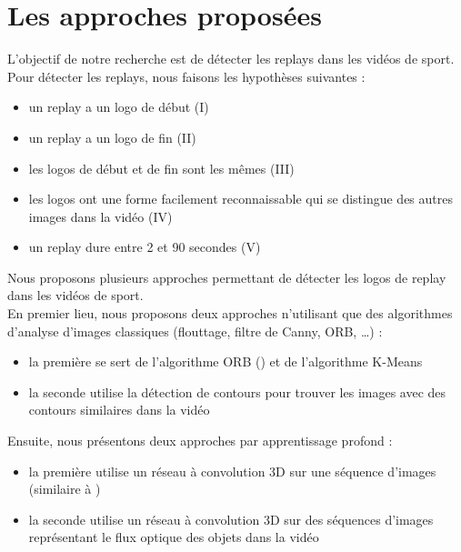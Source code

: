\documentclass[11pt]{article}
\begin{document}
\newpage
\section{Les approches proposées}
\label{sec:orgf5da6ef}
L'objectif de notre recherche est de détecter les replays dans les vidéos de sport.\\

Pour détecter les replays, nous faisons les hypothèses suivantes :\\
\begin{itemize}
\item un replay a un logo de début (I)\\
\item un replay a un logo de fin (II)\\
\item les logos de début et de fin sont les mêmes (III)\\
\item les logos ont une forme facilement reconnaissable qui se distingue des  autres images dans la vidéo (IV)\\
\item un replay dure entre 2 et 90 secondes (V)\\
\end{itemize}

Nous proposons plusieurs approches permettant de détecter les logos de replay dans les vidéos de sport.\\
En premier lieu, nous proposons deux approches n'utilisant que des algorithmes d'analyse d'images classiques (flouttage, filtre de Canny, ORB, \ldots{}) :\\
\begin{itemize}
\item la première se sert de l'algorithme ORB (\cite{Rublee_2011}) et de l'algorithme K-Means\\
\item la seconde utilise la détection de contours pour trouver les images avec des contours similaires dans la vidéo\\
\end{itemize}
Ensuite, nous présentons deux approches par apprentissage profond :\\
\begin{itemize}
\item la première utilise un réseau à convolution 3D sur une séquence d'images (similaire à \cite{Tran_2015})\\
\item la seconde utilise un réseau à convolution 3D sur des séquences d'images représentant le flux optique des objets dans la vidéo\\
\end{itemize}
\end{document}

